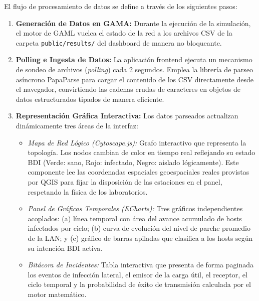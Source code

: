 El flujo de procesamiento de datos se define a través de los siguientes pasos:
\begin{enumerate}
    \item \textbf{Generación de Datos en GAMA:} Durante la ejecución de la simulación, el motor de GAML vuelca el estado de la red a los archivos CSV de la carpeta \texttt{public/results/} del dashboard de manera no bloqueante.
    \item \textbf{Polling e Ingesta de Datos:} La aplicación frontend ejecuta un mecanismo de sondeo de archivos (\textit{polling}) cada 2 segundos. Emplea la librería de parseo asíncrono PapaParse para cargar el contenido de los CSV directamente desde el navegador, convirtiendo las cadenas crudas de caracteres en objetos de datos estructurados tipados de manera eficiente.
    \item \textbf{Representación Gráfica Interactiva:} Los datos parseados actualizan dinámicamente tres áreas de la interfaz:
    \begin{itemize}
        \item \textit{Mapa de Red Lógico (Cytoscape.js):} Grafo interactivo que representa la topología. Los nodos cambian de color en tiempo real reflejando su estado BDI (Verde: sano, Rojo: infectado, Negro: aislado lógicamente). Este componente lee las coordenadas espaciales geoespaciales reales provistas por QGIS para fijar la disposición de las estaciones en el panel, respetando la física de los laboratorios.
        \item \textit{Panel de Gráficas Temporales (ECharts):} Tres gráficos independientes acoplados: (a) línea temporal con área del avance acumulado de hosts infectados por ciclo; (b) curva de evolución del nivel de parche promedio de la LAN; y (c) gráfico de barras apiladas que clasifica a los hosts según su intención BDI activa.
        \item \textit{Bitácora de Incidentes:} Tabla interactiva que presenta de forma paginada los eventos de infección lateral, el emisor de la carga útil, el receptor, el ciclo temporal y la probabilidad de éxito de transmisión calculada por el motor matemático.
    \end{itemize}
\end{enumerate}
